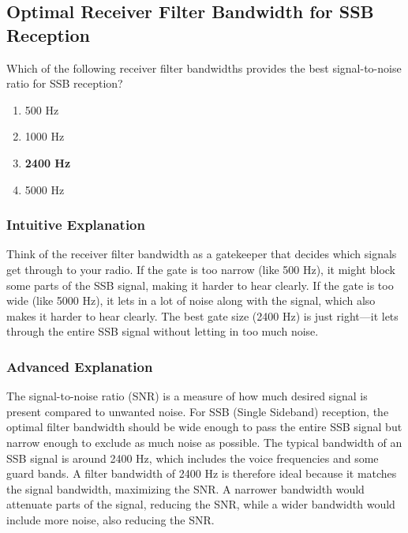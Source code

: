 \subsection{Optimal Receiver Filter Bandwidth for SSB Reception}
\label{T4B10}

\begin{tcolorbox}[colback=gray!10!white,colframe=black!75!black,title=T4B10]
Which of the following receiver filter bandwidths provides the best signal-to-noise ratio for SSB reception?
\begin{enumerate}[noitemsep]
    \item 500 Hz
    \item 1000 Hz
    \item \textbf{2400 Hz}
    \item 5000 Hz
\end{enumerate}
\end{tcolorbox}

\subsubsection*{Intuitive Explanation}
Think of the receiver filter bandwidth as a gatekeeper that decides which signals get through to your radio. If the gate is too narrow (like 500 Hz), it might block some parts of the SSB signal, making it harder to hear clearly. If the gate is too wide (like 5000 Hz), it lets in a lot of noise along with the signal, which also makes it harder to hear clearly. The best gate size (2400 Hz) is just right—it lets through the entire SSB signal without letting in too much noise.

\subsubsection*{Advanced Explanation}
The signal-to-noise ratio (SNR) is a measure of how much desired signal is present compared to unwanted noise. For SSB (Single Sideband) reception, the optimal filter bandwidth should be wide enough to pass the entire SSB signal but narrow enough to exclude as much noise as possible. The typical bandwidth of an SSB signal is around 2400 Hz, which includes the voice frequencies and some guard bands. A filter bandwidth of 2400 Hz is therefore ideal because it matches the signal bandwidth, maximizing the SNR. A narrower bandwidth would attenuate parts of the signal, reducing the SNR, while a wider bandwidth would include more noise, also reducing the SNR.